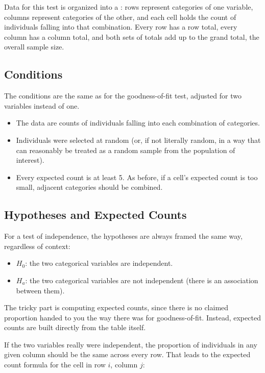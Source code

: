 Data for this test is organized into a : rows represent categories of one variable, columns represent categories of the other, and each cell holds the count of individuals falling into that combination. Every row has a row total, every column has a column total, and both sets of totals add up to the grand total, the overall sample size.


\subsection{Conditions}

The conditions are the same as for the goodness-of-fit test, adjusted for two variables instead of one.

\begin{itemize}
    \item The data are counts of individuals falling into each combination of categories.
    \item Individuals were selected at random (or, if not literally random, in a way that can reasonably be treated as a random sample from the population of interest).
    \item Every expected count is at least 5. As before, if a cell's expected count is too small, adjacent categories should be combined.
\end{itemize}

\subsection{Hypotheses and Expected Counts}

For a test of independence, the hypotheses are always framed the same way, regardless of context:

\begin{itemize}
    \item $H_0$: the two categorical variables are independent.
    \item $H_a$: the two categorical variables are not independent (there is an association between them).
\end{itemize}

The tricky part is computing expected counts, since there is no claimed proportion handed to you the way there was for goodness-of-fit. Instead, expected counts are built directly from the table itself. 

If the two variables really were independent, the proportion of individuals in any given column should be the same across every row. That leads to the expected count formula for the cell in row $i$, column $j$:

